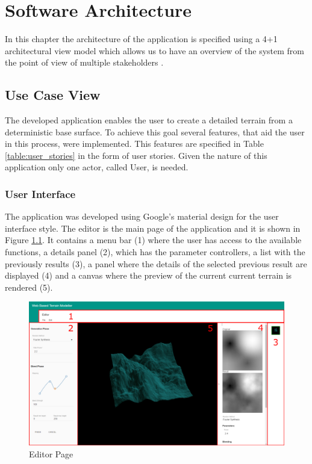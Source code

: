 \chapter{Software Architecture} \label{chap:software_architecture}
  
  In this chapter the architecture of the application is specified using a 4+1 architectural view model which allows us to have an overview of the system from the point of view of multiple stakeholders \cite{Kruchten1995}.

  \section {Use Case View}
    
    The developed application enables the user to create a detailed terrain from a deterministic base surface. To achieve this goal several features, that aid the user in this process, were implemented. This features are specified in Table \ref{table:user_stories} in the form of user stories. Given the nature of this application only one actor, called User, is needed.
    
    
    
    
    \subsection {User Interface}
    
      The application was developed using Google's material design \cite{Google2016} for the user interface style. The editor is the main page of the application and it is shown in Figure \ref{fig:editor_page}. It contains a menu bar (1) where the user has access to the available functions, a details panel (2), which has the parameter controllers, a list with the previously results (3), a panel where the details of the selected previous result are displayed (4) and a canvas where the preview of the current current terrain is rendered (5).
      
      \begin{figure}[H]
      	\centering
      	\includegraphics[width=0.95\linewidth]{images/screenshots/editorWithBoxes.pdf}
      	\caption{Editor Page}
      	\label{fig:editor_page}
      \end{figure}
    
